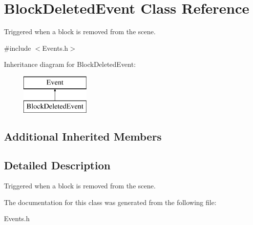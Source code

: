 \hypertarget{classBlockDeletedEvent}{\section{Block\-Deleted\-Event Class Reference}
\label{classBlockDeletedEvent}
}


Triggered when a block is removed from the scene.  




{\ttfamily \#include $<$Events.\-h$>$}

Inheritance diagram for Block\-Deleted\-Event\-:\begin{figure}[H]
\begin{center}
\leavevmode
\includegraphics[height=2.000000cm]{classBlockDeletedEvent}
\end{center}
\end{figure}
\subsection*{Additional Inherited Members}


\subsection{Detailed Description}
Triggered when a block is removed from the scene. 

The documentation for this class was generated from the following file\-:\begin{DoxyCompactItemize}
\item 
Events.\-h\end{DoxyCompactItemize}
